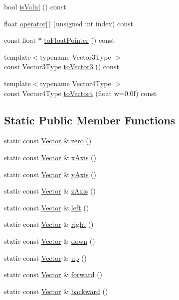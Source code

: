 \begin{DoxyCompactItemize}
\item 
bool \hyperlink{struct_leap_1_1_vector_ae8f445cd11ba6bd4a45de05551277a45}{is\+Valid} () const 
\item 
float \hyperlink{struct_leap_1_1_vector_a45db0a2e00a86c1b9bf7e68ae6b9a20e}{operator\mbox{[}$\,$\mbox{]}} (unsigned int index) const 
\item 
const float $\ast$ \hyperlink{struct_leap_1_1_vector_ad41fdd88c7097efb13b3cb34e2752777}{to\+Float\+Pointer} () const 
\item 
{\footnotesize template$<$typename Vector3\+Type $>$ }\\const Vector3\+Type \hyperlink{struct_leap_1_1_vector_a55fc5ddc43e74988d48797d31a0849f4}{to\+Vector3} () const 
\item 
{\footnotesize template$<$typename Vector4\+Type $>$ }\\const Vector4\+Type \hyperlink{struct_leap_1_1_vector_a2adaf93670f1069e40532d39eb974b3f}{to\+Vector4} (float w=0.\+0f) const 
\end{DoxyCompactItemize}
\subsection*{Static Public Member Functions}
\begin{DoxyCompactItemize}
\item 
static const \hyperlink{struct_leap_1_1_vector}{Vector} \& \hyperlink{struct_leap_1_1_vector_a743b469003fa6622a00ff277d2481da9}{zero} ()
\item 
static const \hyperlink{struct_leap_1_1_vector}{Vector} \& \hyperlink{struct_leap_1_1_vector_a0d90c96672e7ee90fb510d7b96c32861}{x\+Axis} ()
\item 
static const \hyperlink{struct_leap_1_1_vector}{Vector} \& \hyperlink{struct_leap_1_1_vector_a9a387eb8ab05e55708542c031c641f31}{y\+Axis} ()
\item 
static const \hyperlink{struct_leap_1_1_vector}{Vector} \& \hyperlink{struct_leap_1_1_vector_a6ec3652d02a9599bc2a00411a1e05501}{z\+Axis} ()
\item 
static const \hyperlink{struct_leap_1_1_vector}{Vector} \& \hyperlink{struct_leap_1_1_vector_a315ffbbd7f686e1d93bffc6beb11f89d}{left} ()
\item 
static const \hyperlink{struct_leap_1_1_vector}{Vector} \& \hyperlink{struct_leap_1_1_vector_aa4d509a1640d9aa270d095c9ae8e44f2}{right} ()
\item 
static const \hyperlink{struct_leap_1_1_vector}{Vector} \& \hyperlink{struct_leap_1_1_vector_ac1c62a2d280d7a7c67e99f1996076b58}{down} ()
\item 
static const \hyperlink{struct_leap_1_1_vector}{Vector} \& \hyperlink{struct_leap_1_1_vector_a0a38a683c0224b38b75d58db24f51adf}{up} ()
\item 
static const \hyperlink{struct_leap_1_1_vector}{Vector} \& \hyperlink{struct_leap_1_1_vector_a79b32a38e4c99b6ddbf94ac22680d405}{forward} ()
\item 
static const \hyperlink{struct_leap_1_1_vector}{Vector} \& \hyperlink{struct_leap_1_1_vector_a82ea3abc8ae6bb144a5946836fce88ad}{backward} ()
\end{DoxyCompactItemize}
